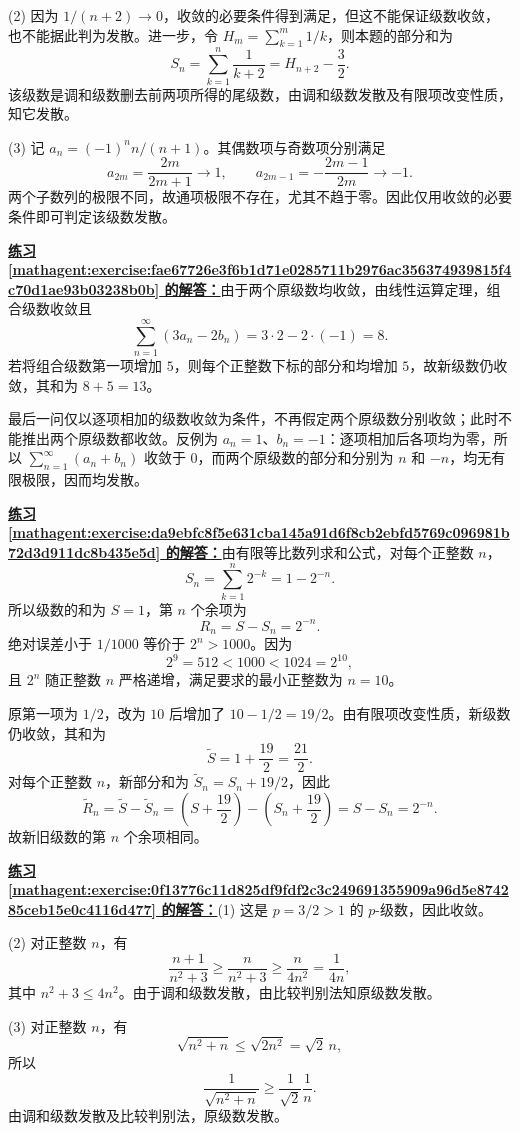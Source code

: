 \documentclass[UTF8,fontset=fandol,11pt]{ctexart}
\begin{document}
(2) 因为 $1/(n+2)\to0$，收敛的必要条件得到满足，但这不能保证级数收敛，也不能据此判为发散。进一步，令 $H_m=\sum_{k=1}^{m}1/k$，则本题的部分和为
\[
S_n=\sum_{k=1}^{n}\frac1{k+2}=H_{n+2}-\frac32.
\]
该级数是调和级数删去前两项所得的尾级数，由调和级数发散及有限项改变性质，知它发散。

(3) 记 $a_n=(-1)^n n/(n+1)$。其偶数项与奇数项分别满足
\[
a_{2m}=\frac{2m}{2m+1}\longrightarrow1,\qquad
a_{2m-1}=-\frac{2m-1}{2m}\longrightarrow-1.
\]
两个子数列的极限不同，故通项极限不存在，尤其不趋于零。因此仅用收敛的必要条件即可判定该级数发散。\par
\par\noindent\textbf{\hyperref[mathagent:exercise:fae67726e3f6b1d71e0285711b2976ac356374939815f4c70d1ae93b03238b0b]{练习 \ref*{mathagent:exercise:fae67726e3f6b1d71e0285711b2976ac356374939815f4c70d1ae93b03238b0b} 的解答：}}由于两个原级数均收敛，由线性运算定理，组合级数收敛且
\[
\sum_{n=1}^{\infty}(3a_n-2b_n)=3\cdot2-2\cdot(-1)=8.
\]
若将组合级数第一项增加 $5$，则每个正整数下标的部分和均增加 $5$，故新级数仍收敛，其和为 $8+5=13$。

最后一问仅以逐项相加的级数收敛为条件，不再假定两个原级数分别收敛；此时不能推出两个原级数都收敛。反例为 $a_n=1$、$b_n=-1$：逐项相加后各项均为零，所以 $\sum_{n=1}^{\infty}(a_n+b_n)$ 收敛于 $0$，而两个原级数的部分和分别为 $n$ 和 $-n$，均无有限极限，因而均发散。\par
\par\noindent\textbf{\hyperref[mathagent:exercise:da9ebfc8f5e631cba145a91d6f8cb2ebfd5769c096981b72d3d911dc8b435e5d]{练习 \ref*{mathagent:exercise:da9ebfc8f5e631cba145a91d6f8cb2ebfd5769c096981b72d3d911dc8b435e5d} 的解答：}}由有限等比数列求和公式，对每个正整数 $n$，
\[
S_n=\sum_{k=1}^{n}2^{-k}=1-2^{-n}.
\]
所以级数的和为 $S=1$，第 $n$ 个余项为
\[
R_n=S-S_n=2^{-n}.
\]
绝对误差小于 $1/1000$ 等价于 $2^n>1000$。因为
\[
2^9=512<1000<1024=2^{10},
\]
且 $2^n$ 随正整数 $n$ 严格递增，满足要求的最小正整数为 $n=10$。

原第一项为 $1/2$，改为 $10$ 后增加了 $10-1/2=19/2$。由有限项改变性质，新级数仍收敛，其和为
\[
\widetilde S=1+\frac{19}{2}=\frac{21}{2}.
\]
对每个正整数 $n$，新部分和为 $\widetilde S_n=S_n+19/2$，因此
\[
\widetilde R_n=\widetilde S-\widetilde S_n
=\left(S+\frac{19}{2}\right)-\left(S_n+\frac{19}{2}\right)
=S-S_n=2^{-n}.
\]
故新旧级数的第 $n$ 个余项相同。\par
\par\noindent\textbf{\hyperref[mathagent:exercise:0f13776c11d825df9fdf2c3c249691355909a96d5e874285ceb15e0c4116d477]{练习 \ref*{mathagent:exercise:0f13776c11d825df9fdf2c3c249691355909a96d5e874285ceb15e0c4116d477} 的解答：}}(1) 这是 $p=3/2>1$ 的 $p$-级数，因此收敛。

(2) 对正整数 $n$，有
\[
\frac{n+1}{n^2+3}\geq\frac{n}{n^2+3}\geq\frac{n}{4n^2}=\frac{1}{4n},
\]
其中 $n^2+3\leq4n^2$。由于调和级数发散，由比较判别法知原级数发散。

(3) 对正整数 $n$，有
\[
\sqrt{n^2+n}\leq\sqrt{2n^2}=\sqrt{2}\,n,
\]
所以
\[
\frac{1}{\sqrt{n^2+n}}\geq\frac{1}{\sqrt{2}}\frac{1}{n}.
\]
由调和级数发散及比较判别法，原级数发散。\par
\end{document}
